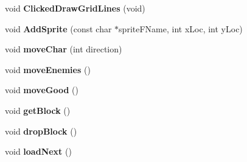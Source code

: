 \begin{DoxyCompactItemize}
\item 
\hypertarget{classengine_aff95606d7fa78ddd3f13b0573d8fa284}{void {\bfseries Clicked\-Draw\-Grid\-Lines} (void)}\label{classengine_aff95606d7fa78ddd3f13b0573d8fa284}

\item 
\hypertarget{classengine_a804d510d34deaebcfff0bf5af93568ec}{void {\bfseries Add\-Sprite} (const char $\ast$sprite\-F\-Name, int x\-Loc, int y\-Loc)}\label{classengine_a804d510d34deaebcfff0bf5af93568ec}

\item 
\hypertarget{classengine_ac084e69968320aa57383fc251f54b887}{void {\bfseries move\-Char} (int direction)}\label{classengine_ac084e69968320aa57383fc251f54b887}

\item 
\hypertarget{classengine_ab27f5792c30dfd6e6cc4fcfd390d15eb}{void {\bfseries move\-Enemies} ()}\label{classengine_ab27f5792c30dfd6e6cc4fcfd390d15eb}

\item 
\hypertarget{classengine_ad010e22061b9a72eb0ff69821ffbfbc6}{void {\bfseries move\-Good} ()}\label{classengine_ad010e22061b9a72eb0ff69821ffbfbc6}

\item 
\hypertarget{classengine_a3fc3e6605e74eb8ba71316b15471a1c3}{void {\bfseries get\-Block} ()}\label{classengine_a3fc3e6605e74eb8ba71316b15471a1c3}

\item 
\hypertarget{classengine_ac37f50e0ee7aa83b113d8e4dbd9ee069}{void {\bfseries drop\-Block} ()}\label{classengine_ac37f50e0ee7aa83b113d8e4dbd9ee069}

\item 
\hypertarget{classengine_a56c6f2331fa2045f184b183c89f9c199}{void {\bfseries load\-Next} ()}\label{classengine_a56c6f2331fa2045f184b183c89f9c199}

\end{DoxyCompactItemize}
